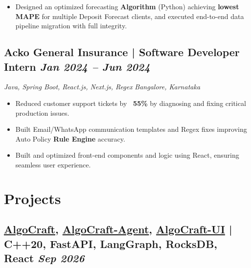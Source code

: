 \documentclass[a4paper,10pt]{article}
\newcommand{\subtext}[1]{
#1\par\vspace{-0.2cm}}
\newenvironment{zitemize}{
\begin{itemize}\itemsep0pt \parskip0pt \parsep1pt}
{\end{itemize}\vspace{-0.7cm}}
\begin{document}
\begin{zitemize}
\item Designed an optimized forecasting \textbf{Algorithm} (Python) achieving \textbf{lowest MAPE} for multiple Deposit Forecast clients, and executed end-to-end data pipeline migration with full integrity.
\end{zitemize}
\vspace{0.1cm}

\subsection*{Acko General Insurance | Software Developer Intern \hfill {\small\textit{Jan 2024 – Jun 2024}}}
\subtext{\textit{Java, Spring Boot, React.js, Next.js, Regex} \hfill \textit{Bangalore, Karnataka}}
\begin{zitemize}
\item Reduced customer support tickets by \textbf{~55\%} by diagnosing and fixing critical production issues.
\item Built Email/WhatsApp communication templates and Regex fixes improving Auto Policy \textbf{Rule Engine} accuracy.
\item Built and optimized front-end components and logic using React, ensuring seamless user experience.
\end{zitemize}
\vspace{0.0cm}


\section{Projects}

\subsection*{\fontsize{10pt}{12pt}\selectfont\href{https://github.com/Ruhangrk/AlgoCraft}{{\textcolor{custompurple}{\mdseries AlgoCraft}}}, \href{https://github.com/Ruhangrk/AlgoCraft-Agent}{{\textcolor{custompurple}{\mdseries AlgoCraft-Agent}}}, \href{https://github.com/Ruhangrk/AlgoCraft-UI}{{\textcolor{custompurple}{\mdseries AlgoCraft-UI}}} | C++20, FastAPI, LangGraph, RocksDB, React \hfill {\small\textit{Sep 2026}}}
\end{document}
